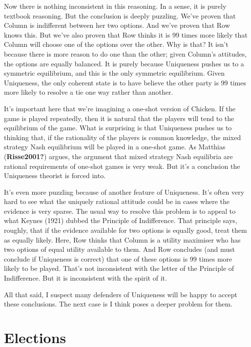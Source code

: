 \documentclass[
  11pt,
]{article}
\begin{document}
Now there is nothing inconsistent in this reasoning. In a sense, it is purely textbook reasoning. But the conclusion is deeply puzzling. We've proven that Column is indifferent between her two options. And we've proven that Row knows this. But we've also proven that Row thinks it is 99 times more likely that Column will choose one of the options over the other. Why is that? It isn't because there is more reason to do one than the other; given Column's attitudes, the options are equally balanced. It is purely because Uniqueness pushes us to a symmetric equilibrium, and this is the only symmetric equilibrium. Given Uniqueness, the only coherent state is to have believe the other party is 99 times more likely to resolve a tie one way rather than another.

It's important here that we're imagining a one-shot version of Chicken. If the game is played repeatedly, then it is natural that the players will tend to the equilibrium of the game. What is surprising is that Uniqueness pushes us to thinking that, if the rationality of the players is common knowledge, the mixed strategy Nash equilibrium will be played in a one-shot game. As Matthias (\textbf{Risse2001?}) argues, the argument that mixed strategy Nash equilibria are rational requirements of one-shot games is very weak. But it's a conclusion the Uniqueness theorist is forced into.

It's even more puzzling because of another feature of Uniqueness. It's often very hard to see what the uniquely rational attitude could be in cases where the evidence is very sparse. The usual way to resolve this problem is to appeal to what Keynes (1921) dubbed the Principle of Indifference. That principle says, roughly, that if the evidence available for two options is equally good, treat them as equally likely. Here, Row thinks that Column is a utility maximiser who has two options of equal utility available to them. And Row concludes (and must conclude if Uniqueness is correct) that one of these options is 99 times more likely to be played. That's not inconsistent with the letter of the Principle of Indifference. But it is inconsistent with the spirit of it.

All that said, I suspect many defenders of Uniqueness will be happy to accept these conclusions. The next case is I think poses a deeper problem for them.

\hypertarget{elections}{%
\section{Elections}\label{elections}}
\end{document}
